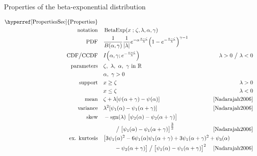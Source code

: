 

\begin{table*}[tp!]
\caption[Beta-exponential distribution -- Properties]{Properties of the beta-exponential distribution}
\begin{align*}
\text{\hyperref[PropertiesSec]{Properties}}  \quad& \\
\text{notation} \quad & \op{BetaExp}(x\given \pLoc,\pScale,\alpha, \gamma)  \checked
\\
\text{PDF}\quad &   \frac{1}{B(\alpha, \gamma)} \frac{1}{|\pScale|} e^{-\alpha \frac{x-\pLoc}{\pScale} }  \Left(1 - e^{-\frac{x-\pLoc}{\pScale}  }\Right)^{\gamma-1}  \checked
\\
\text{CDF} \big/ \text{CCDF} \quad  & I\Left(\alpha,\gamma; e^{-\frac{x-\pLoc}{\pScale}} \Right)\checked & \hspace{-2em}\pScale>0 \ \big/ \ \pScale<0
\\
\text{parameters}\quad &   \pLoc,\ \pScale,\ \alpha,\  \gamma \text{ in } \Real	\checked \\
& \alpha,\ \gamma >0	\checked
\\
\text{support} \quad &     x \geq \pLoc \checked&  \pScale > 0
\\
&   x\leq \pLoc  \checked&  \pScale < 0 
\\
\text{mean} \quad  &  \pLoc+ \pScale [\psi(\alpha+\gamma) -\psi(\alpha)  ]  \checked & \text{\cite{Nadarajah2006}}
\\
\text{variance} \quad  & \pScale^2 [\psi_1(\alpha)-\psi_1(\alpha+\gamma) ]  \checked & \text{\cite{Nadarajah2006}}
\\
\text{skew} \quad  &-\op{sgn}(\pScale)\ \bigl[{\psi_2(\alpha)-\psi_2(\alpha+\gamma)}\bigr] \\
& \qquad \bigm/ {  \bigl[\psi_1(\alpha)-\psi_1(\alpha+\gamma) \bigr]^{\tfrac{3}{2}} } \checked \hspace{-2em} &  \text{\cite{Nadarajah2006}}
\\
\text{ex. kurtosis} \quad  &
\bigl[3\psi_1(\alpha)^2- 6\psi_1(\alpha)\psi_1(\alpha+\gamma)+ 3\psi_1(\alpha+\gamma)^2+\psi_3(\alpha)
\hspace{-4em} \\ &\qquad -\psi_3(\alpha+\gamma)\bigr] \bigm/ \bigl[ \psi_1(\alpha)-\psi_1(\alpha+\gamma) \bigr]^2
\checked	
 				&  \text{\cite{Nadarajah2006}}

\end{align*}
\end{table*}
